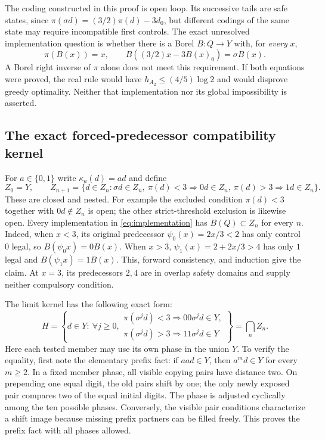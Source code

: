 \documentclass[11pt,reqno]{amsart}
\numberwithin{equation}{section}
\theoremstyle{definition}
\begin{document}
The coding constructed in this proof is open loop. Its successive
tails are safe states, since
$\pi(\sigma d)=(3/2)\pi(d)-3d_0$, but different codings
of the same state may require incompatible first controls.
The exact unresolved implementation question is whether there is
a Borel $B:Q\to Y$ with, for \emph{every} $x$,
\begin{equation}\label{eq:implementation}
 \pi(B(x))=x,\qquad
 B((3/2)x-3B(x)_0)=\sigma B(x).
\end{equation}
A Borel right inverse of $\pi$ alone does not meet this requirement.
If both equations were proved, the real rule would have
$h_{A_2}\le(4/5)\log2$ and would disprove greedy optimality.
Neither that implementation nor its global impossibility is asserted.

\subsection{The exact forced-predecessor compatibility kernel}
For $a\in\{0,1\}$ write $\kappa_a(d)=ad$ and define
\[
 Z_0=Y,\qquad Z_{n+1}=\{d\in Z_n:\sigma d\in Z_n,
 \ \pi(d)<3\Rightarrow0d\in Z_n,
 \ \pi(d)>3\Rightarrow1d\in Z_n\}.
\]
These are closed and nested. For example the excluded condition
$\pi(d)<3$ together with $0d\notin Z_n$ is open; the other
strict-threshold exclusion is likewise open.
Every implementation in \eqref{eq:implementation} has
$B(Q)\subset Z_n$ for every $n$. Indeed, when $x<3$,
its original predecessor $\psi_0(x)=2x/3<2$ has only control
$0$ legal, so $B(\psi_0x)=0B(x)$. When $x>3$,
$\psi_1(x)=2+2x/3>4$ has only $1$ legal and
$B(\psi_1x)=1B(x)$. This, forward consistency, and induction
give the claim. At $x=3$, its predecessors $2,4$ are in
overlap safety domains and supply neither compulsory condition.

The limit kernel has the following exact form:
\begin{equation}\label{eq:kernel-H}
 H=\left\{d\in Y:\ \forall j\ge0,
 \begin{array}{l}
 \pi(\sigma^jd)<3\Rightarrow00\sigma^jd\in Y,\\
 \pi(\sigma^jd)>3\Rightarrow11\sigma^jd\in Y
 \end{array}\right\}=\bigcap_nZ_n.
\end{equation}
Here each tested member may use its own phase in the union $Y$.
To verify the equality, first note the elementary prefix fact:
if $aa d\in Y$, then $a^m d\in Y$ for every $m\ge2$.
In a fixed member phase, all visible copying pairs have distance
two. On prepending one equal digit, the old pairs shift by one;
the only newly exposed pair compares two of the equal initial
digits. The phase is adjusted cyclically among the ten possible
phases. Conversely, the visible pair conditions characterize a
shift image because missing prefix partners can be filled freely.
This proves the prefix fact with all phases allowed.
\end{document}
